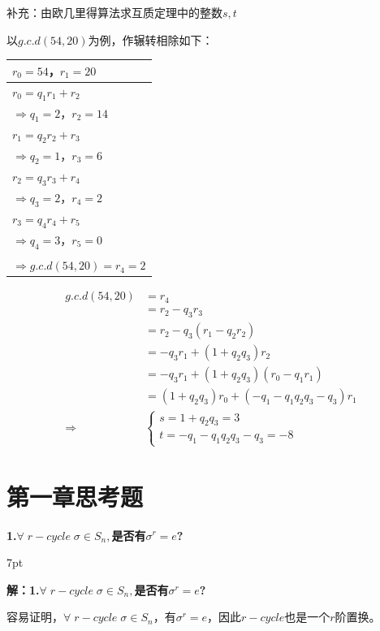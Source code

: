 \documentclass[zihao=-4,UTF8]{report}
\newenvironment{formal}{%
\def\FrameCommand{%
\hspace{1pt}%
{\color{gray}\vrule width 2pt}%
{\color{formalshade}\vrule width 4pt}%
\colorbox{formalshade}%
}%
\MakeFramed{\advance\hsize-\width\FrameRestore}%
\noindent\hspace{-4.55pt}%
\begin{adjustwidth}{}{7pt}%
\vspace{2pt}\vspace{2pt}%
}
{%
\vspace{2pt}\end{adjustwidth}\endMakeFramed%
}
\begin{document}
{\color{gray}
补充：由欧几里得算法求互质定理中的整数$s,t$\par
以$g.c.d(54,20)$为例，作辗转相除如下：\par
\begin{minipage}[c]{0.35\columnwidth}
    \begin{table}[H]
        \color{gray}
        \centering
        \begin{tabular}{l} 
        \toprule
        $r_0=54$，$r_1=20$ \\ 
        \hline
        $r_0 = q_1r_1+r_2$ \\
        $\Longrightarrow q_1 = 2$，$r_2=14$  \\
        \hline
        $r_1 = q_2r_2+r_3$ \\
        $\Longrightarrow q_2 = 1$，$r_3=6$  \\
        \hline
        $r_2 = q_3r_3+r_4$ \\
        $\Longrightarrow q_3 = 2$，$r_4=2$  \\ 
        \hline
        $r_3 = q_4r_4+r_5$ \\
        $\Longrightarrow q_4 = 3$，$r_5=0$  \\ 
        \bottomrule\\
        $\Longrightarrow g.c.d(54,20)=r_4=2$
        \end{tabular}
    \end{table}
\end{minipage}
\begin{minipage}[c]{0.54\columnwidth}
    \begin{align*}
        g.c.d(54,20)&=r_4\\
        &=r_2-q_3r_3\\
        &=r_2-q_3(r_1-q_2r_2)\\
        &=-q_3r_1+(1+q_2q_3)r_2\\
        &=-q_3r_1+(1+q_2q_3)(r_0-q_1r_1)\\
        &=(1+q_2q_3)r_0+(-q_1-q_1q_2q_3-q_3)r_1\\
        \Longrightarrow &
        \begin{cases}
            s=1+q_2q_3=3\\
            t=-q_1-q_1q_2q_3-q_3=-8
        \end{cases}
    \end{align*}
\end{minipage}
} 

\section{第一章思考题}
\textbf{1.\;$\forall\;r-cycle\;\sigma\in S_{n},$是否有$\sigma^{r}=e$?}
\begin{formal}
    \textbf{解：1.\;$\forall\;r-cycle\;\sigma\in S_{n},$是否有$\sigma^{r}=e$?}\par 
    容易证明，$\forall\;r-cycle\;\sigma \in S_n$，有$\sigma^r=e$，因此$r-cycle$也是一个$r$阶置换。
\end{formal}
\end{document}
